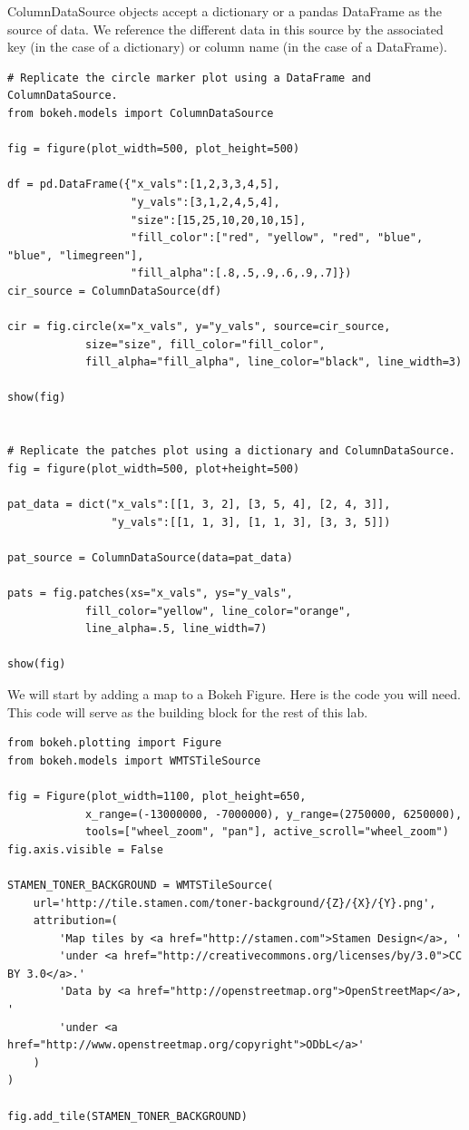 ColumnDataSource objects accept a dictionary or a pandas DataFrame as the source
of data. We reference the different data in this source by the associated key
(in the case of a dictionary) or column name (in the case of a DataFrame).

\begin{lstlisting}
# Replicate the circle marker plot using a DataFrame and ColumnDataSource.
from bokeh.models import ColumnDataSource

fig = figure(plot_width=500, plot_height=500)

df = pd.DataFrame({"x_vals":[1,2,3,3,4,5],
                   "y_vals":[3,1,2,4,5,4],
                   "size":[15,25,10,20,10,15],
                   "fill_color":["red", "yellow", "red", "blue", "blue", "limegreen"],
                   "fill_alpha":[.8,.5,.9,.6,.9,.7]})
cir_source = ColumnDataSource(df)

cir = fig.circle(x="x_vals", y="y_vals", source=cir_source,
            size="size", fill_color="fill_color",
            fill_alpha="fill_alpha", line_color="black", line_width=3)

show(fig)


# Replicate the patches plot using a dictionary and ColumnDataSource.
fig = figure(plot_width=500, plot+height=500)

pat_data = dict("x_vals":[[1, 3, 2], [3, 5, 4], [2, 4, 3]],
                "y_vals":[[1, 1, 3], [1, 1, 3], [3, 3, 5]])

pat_source = ColumnDataSource(data=pat_data)

pats = fig.patches(xs="x_vals", ys="y_vals",
            fill_color="yellow", line_color="orange",
            line_alpha=.5, line_width=7)

show(fig)
\end{lstlisting}

\begin{problem} \label{prob:map}
We will start by adding a map to a Bokeh Figure. Here is the code you will need.
This code will serve as the building block for the rest of this lab.

\begin{lstlisting}
from bokeh.plotting import Figure
from bokeh.models import WMTSTileSource

fig = Figure(plot_width=1100, plot_height=650,
            x_range=(-13000000, -7000000), y_range=(2750000, 6250000),
            tools=["wheel_zoom", "pan"], active_scroll="wheel_zoom")
fig.axis.visible = False

STAMEN_TONER_BACKGROUND = WMTSTileSource(
    url='http://tile.stamen.com/toner-background/{Z}/{X}/{Y}.png',
    attribution=(
        'Map tiles by <a href="http://stamen.com">Stamen Design</a>, '
        'under <a href="http://creativecommons.org/licenses/by/3.0">CC BY 3.0</a>.'
        'Data by <a href="http://openstreetmap.org">OpenStreetMap</a>, '
        'under <a href="http://www.openstreetmap.org/copyright">ODbL</a>'
    )
)

fig.add_tile(STAMEN_TONER_BACKGROUND)
\end{lstlisting}

\end{problem}


